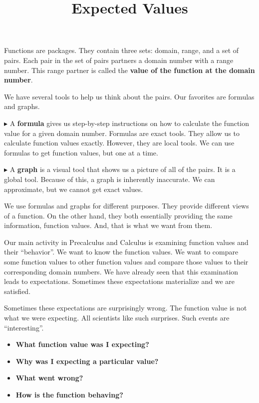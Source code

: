 \documentclass{ximera}
\title{Expected Values}
\begin{document}
\begin{abstract}

\end{abstract}
\maketitle




Functions are packages.  They contain three sets: domain, range, and a set of pairs.  Each pair in the set of pairs partners a domain number with a range number.  This range partner is called the \textbf{value of the function \textcolor{purple!85!blue}{at} the domain number}.


We have several tools to help us think about the pairs. Our favorites are formulas and graphs. 


$\blacktriangleright$ A \textbf{\textcolor{purple!85!blue}{formula}} gives us step-by-step instructions on how to calculate the function value for a given domain number.   Formulas are exact tools. They allow us to calculate function values exactly. However, they are local tools.  We can use formulas to get function values, but one at a time.


$\blacktriangleright$ A \textbf{\textcolor{purple!85!blue}{graph}} is a visual tool that shows us a picture of all of the pairs.  It is a global tool. Because of this, a graph is inherently inaccurate.  We can approximate, but we cannot get exact values.  


We use formulas and graphs for different purposes. They provide different views of a function.  On the other hand, they both essentially providing the same information, function values. And, that is what we want from them.


Our main activity in Precalculus and Calculus is examining function values and their ``behavior''.  We want to know the function values.  We want to compare some function values to other function values and compare those values to their corresponding domain numbers.  We have already seen that this examination leads to expectations.  Sometimes these expectations materialize and we are satisfied.  

Sometimes these expectations are surprisingly wrong.  The function value is not what we were expecting. All scientists like such surprises. Such events are ``interesting''. 

\begin{itemize}
\item  \textbf{\textcolor{blue!75!black}{What function value was I expecting?}}
\item  \textbf{\textcolor{blue!75!black}{Why was I expecting a particular value?}}
\item  \textbf{\textcolor{blue!75!black}{What went wrong?}}
\item  \textbf{\textcolor{blue!75!black}{How is the function behaving?}}
\end{itemize} 
\end{document}
